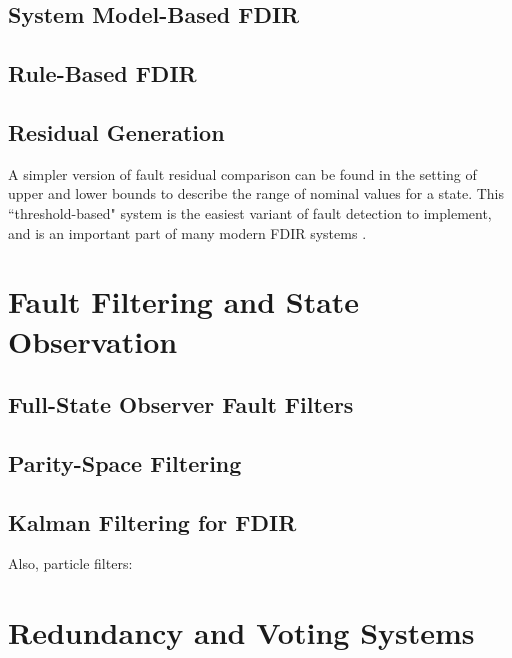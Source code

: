 \cite{willsky1976survey}


\subsection{System Model-Based FDIR}

\cite{hwang2010survey}


\subsection{Rule-Based FDIR}


\cite{schwabacher2008pre}


\subsection{Residual Generation}


A simpler version of fault residual comparison can be found in the setting of upper and lower bounds to describe the range of nominal values for a state. This ``threshold-based" system is the easiest variant of fault detection to implement, and is an important part of many modern FDIR systems \cite{walker1979fault}.

\section{Fault Filtering and State Observation}


\subsection{Full-State Observer Fault Filters}


\subsection{Parity-Space Filtering}


\subsection{Kalman Filtering for FDIR}

\cite{larson2002model}
\cite{washington2000board}

Also, particle filters:

\cite{dearden2004real}

\section{Redundancy and Voting Systems}


